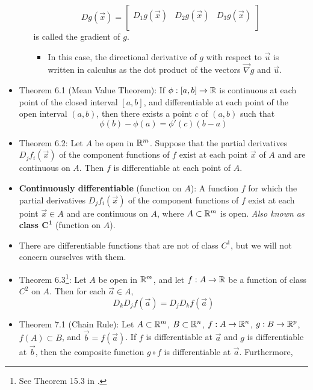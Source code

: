 \documentclass[../notes.tex]{subfiles}
\begin{document}
\begin{itemize}
\begin{itemize}
        \begin{equation*}
            Dg(\vec{x}) =
            \begin{bmatrix}
                D_1g(\vec{x}) & D_2g(\vec{x}) & D_3g(\vec{x})\\
            \end{bmatrix}
        \end{equation*}
        is called the gradient of $g$.
        \begin{itemize}
            \item In this case, the directional derivative of $g$ with respect to $\vec{u}$ is written in calculus as the dot product of the vectors $\stackrel{\rightarrow}{\nabla}g$ and $\vec{u}$.
        \end{itemize}
    \end{itemize}
    \item Theorem 6.1 (Mean Value Theorem): If $\phi:[a,b]\to\mathbb{R}$ is continuous at each point of the closed interval $[a,b]$, and differentiable at each point of the open interval $(a,b)$, then there exists a point $c$ of $(a,b)$ such that
    \begin{equation*}
        \phi(b)-\phi(a) = \phi'(c)(b-a)
    \end{equation*}
    \item Theorem 6.2: Let $A$ be open in $\mathbb{R}^m$. Suppose that the partial derivatives $D_jf_i(\vec{x})$ of the component functions of $f$ exist at each point $\vec{x}$ of $A$ and are continuous on $A$. Then $f$ is differentiable at each point of $A$.
    \item \textbf{Continuously differentiable} (function on $A$): A function $f$ for which the partial derivatives $D_jf_i(\vec{x})$ of the component functions of $f$ exist at each point $\vec{x}\in A$ and are continuous on $A$, where $A\subset\mathbb{R}^m$ is open. \emph{Also known as} \textbf{class $\bm{C^1}$} (function on $A$).
    \item There are differentiable functions that are not of class $C^1$, but we will not concern ourselves with them.
    \item Theorem 6.3\footnote{See Theorem 15.3 in \textcite{bib:CAAGThomasNotes}.}: Let $A$ be open in $\mathbb{R}^m$, and let $f:A\to\mathbb{R}$ be a function of class $C^2$ on $A$. Then for each $\vec{a}\in A$,
    \begin{equation*}
        D_kD_jf(\vec{a}) = D_jD_kf(\vec{a})
    \end{equation*}
    \item Theorem 7.1 (Chain Rule): Let $A\subset\mathbb{R}^m$, $B\subset\mathbb{R}^n$, $f:A\to\mathbb{R}^n$, $g:B\to\mathbb{R}^p$, $f(A)\subset B$, and $\vec{b}=f(\vec{a})$. If $f$ is differentiable at $\vec{a}$ and $g$ is differentiable at $\vec{b}$, then the composite function $g\circ f$ is differentiable at $\vec{a}$. Furthermore,

\end{itemize}
\end{document}
